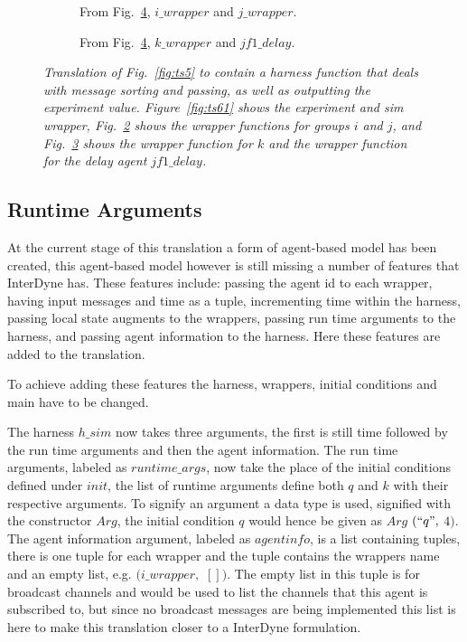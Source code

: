 \documentclass{article}
\begin{document}
\begin{figure}[H]\ContinuedFloat
	\centering
	\begin{subfigure}[b]{1\textwidth}
	
	\caption{From Fig.~\ref{fig:ts6}, $i\_wrapper$ and $j\_wrapper$.}
        \label{fig:ts62}
	\end{subfigure}
	\caption*{}
\end{figure}
	
\begin{figure}[H]\ContinuedFloat
	\centering
	\begin{subfigure}[b]{1\textwidth}
	
	\caption{From Fig.~\ref{fig:ts6}, $k\_wrapper$ and $jf1\_delay$.}
        \label{fig:ts63}
	\end{subfigure}
	\caption{\it Translation of Fig.~\ref{fig:ts5} to contain a harness function that deals with message sorting and passing, as well as outputting the experiment value. Figure~\ref{fig:ts61} shows the experiment and sim wrapper, Fig.~\ref{fig:ts62} shows the wrapper functions for groups $i$ and $j$, and Fig.~\ref{fig:ts63} shows the wrapper function for $k$ and the wrapper function for the delay agent $jf1\_delay$.}
	\label{fig:ts6}
\end{figure} 





\subsection{Runtime Arguments}
At the current stage of this translation a form of agent-based model has been created, this agent-based model however is still missing a number of features that InterDyne has. These features include: passing the agent id to each wrapper, having input messages and time as a tuple, incrementing time within the harness, passing local state augments to the wrappers, passing run time arguments to the harness, and passing agent information to the harness. Here these features are added to the translation. 

To achieve adding these features the harness, wrappers, initial conditions and main have to be changed. 

 The harness $h\_sim$ now takes three arguments, the first is still time followed by the run time arguments and then the agent information. The run time arguments, labeled as $runtime\_args$, now take the place of the initial conditions defined under $init$, the list of runtime arguments define both $q$ and $k$ with their respective arguments. To signify an argument a data type is used, signified with the constructor $Arg$, the initial condition $q$ would hence be given as $Arg$ $(``q",$ $4)$. The agent information argument, labeled as $agentinfo$, is a list containing tuples, there is one tuple for each wrapper and the tuple contains the wrappers name and an empty list, e.g. $(i\_wrapper,$ $[])$. The empty list in this tuple is for broadcast channels and would be used to list the channels that this agent is subscribed to, but since no broadcast messages are being implemented this list is here to make this translation closer to a InterDyne formulation.
\end{document}
